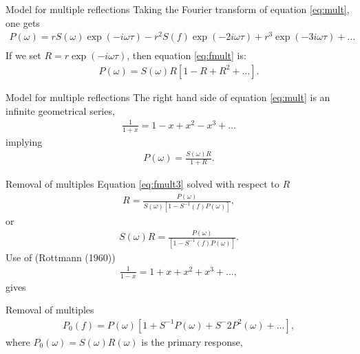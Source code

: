 \documentclass[xcolor=dvipsnames,notes]{beamer}
\begin{document}
%
\begin{frame}{Model for multiple reflections}
Taking the Fourier transform of equation \eqref{eq:mult}, one gets
%
\begin{eqnarray}
  P(\omega) = rS(\omega)\exp(-i\omega \tau) 
   -  r^2 S(f)\exp(-2i\omega\tau) +  r^3\exp(-3i\omega \tau) 
   + \ldots \nonumber\\
                                \label{eq:fmult}
\end{eqnarray}
%
If we set $R=r\exp(-i\omega\tau)$, then equation \eqref{eq:fmult} is: 
%
\begin{eqnarray}
  P(\omega) = S(\omega)R\left[1 -  R +  R^2  + \ldots\right].
                                \label{eq:fmult2}
\end{eqnarray}
\end{frame}
%
%
\begin{frame}{Model for multiple reflections}
The right hand side of equation \eqref{eq:mult} is an infinite geometrical series,
%
\begin{eqnarray}
\frac{1}{1+x} = 1-x+x^2-x^3+\ldots
                            \label{eq:fmult2b}
\end{eqnarray}
implying 
%
\begin{eqnarray}
  P(\omega) = \frac{S(\omega)R}{1+R}.
                                \label{eq:fmult3}
\end{eqnarray}
%
\end{frame}
%
%
\begin{frame}{Removal of multiples}
%
Equation \eqref{eq:fmult3} solved with respect to $R$ 
%
\begin{eqnarray}
  R = \frac{P(\omega)}{S(\omega)[1-S^{-1}(f)P(\omega)]},
                                \label{eq:ch6-101}
\end{eqnarray}
%
or
%
\begin{eqnarray}
  S(\omega)R = \frac{P(\omega)}{[1-S^{-1}(f)P(\omega)]}.
                                \label{eq:ch6-102}
\end{eqnarray}
%
Use of (Rottmann (1960)) 
%
\begin{eqnarray}
  \frac{1}{1-x} = 1+x+x^2+x^3+\ldots,
\end{eqnarray}
gives
\end{frame}
%
%
\begin{frame}{Removal of multiples}
%
\begin{eqnarray}
  P_0(f) = P(\omega)\left[1+S^{-1}P(\omega) + S^-2P^2(\omega)+\ldots\right],
                                \label{eq:ch6-103}
\end{eqnarray}
%
where $P_0(\omega)= S(\omega)R(\omega)$ is the primary response,
\end{frame}
\end{document}
